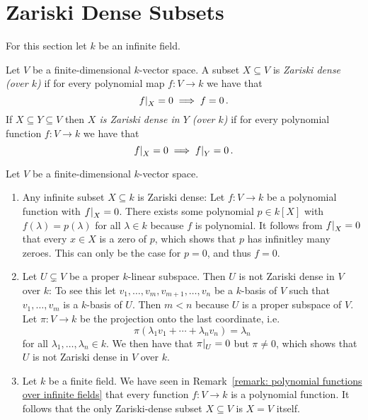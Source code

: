 \section{Zariski Dense Subsets}


\begin{fluff}
  For this section let $k$ be an infinite field.
\end{fluff}


\begin{definition}
  Let $V$ be a finite-dimensional $k$-vector space.
  A subset $X \subseteq V$ is \emph{Zariski dense \textup(over $k$\textup)} if for every polynomial map $f \colon V \to k$ we have that
  \[
              \restrict{f}{X} = 0
    \implies  f = 0 \,.
  \]
  If $X \subseteq Y \subseteq V$ then \emph{$X$ is Zariski dense in $Y$ \textup(over $k$\textup)} if for every polynomial function $f \colon V \to k$ we have that
  \[
              \restrict{f}{X} = 0
    \implies  \restrict{f}{Y} = 0 \,.
  \]
\end{definition}


\begin{example}
  Let $V$ be a finite-dimensional $k$-vector space.
  \begin{enumerate}
    \item 
      Any infinite subset $X \subseteq k$ is Zariski dense:
      Let $f \colon V \to k$ be a polynomial function with $\restrict{f}{X} = 0$.
      There exists some polynomial $p \in k[X]$ with $f(\lambda) = p(\lambda)$ for all $\lambda \in k$ because $f$ is polynomial.
      It follows from $\restrict{f}{X} = 0$ that every $x \in X$ is a zero of $p$, which shows that $p$ has infinitley many zeroes.
      This can only be the case for $p = 0$, and thus $f = 0$.
    \item
      Let $U \subsetneq V$ be a proper $k$-linear subspace.
      Then $U$ is not Zariski dense in $V$ over $k$:
      To see this let $v_1, \dotsc, v_m, v_{m+1}, \dotsc, v_n$ be a $k$-basis of $V$ such that $v_1, \dotsc, v_m$ is a $k$-basis of $U$.
      Then $m < n$ because $U$ is a proper subspace of $V$.
      Let $\pi \colon V \to k$ be the projection onto the last coordinate, i.e.
      \[
          \pi\left( \lambda_1 v_1 + \dotsb + \lambda_n v_n \right)
        = \lambda_n
      \]
      for all $\lambda_1, \dotsc, \lambda_n \in k$.
      We then have that $\restrict{\pi}{U} = 0$ but $\pi \neq 0$, which shows that $U$ is not Zariski dense in $V$ over $k$.
    \item
      Let $k$ be a finite field.
      We have seen in Remark~\ref{remark: polynomial functions over infinite fields} that every function $f \colon V \to k$ is a polynomial function.
      It follows that the only Zariski-dense subset $X \subseteq V$ is $X = V$ itself.
  \end{enumerate}
\end{example}



